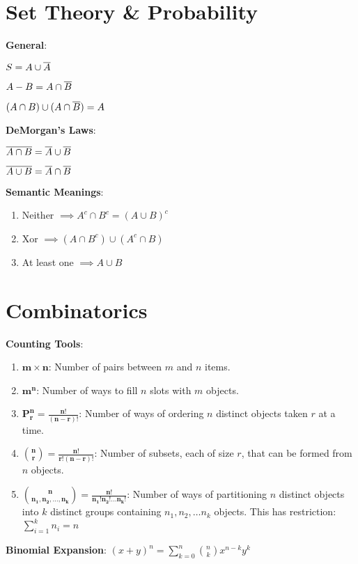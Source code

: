 \documentclass[12pt]{article}
\newcommand{\defn}[1]{\textbf{#1}:}
\newcommand{\mdef}[1]{$\mathbf{#1}$:}
\begin{document}
\section{Set Theory \& Probability}

\defn{General}
\begin{enumerate*}[label=(\roman*)]
    \item $S = A\cup \overline{A}$
    \item $A-B = A\cap \overline{B}$
    \item $(A\cap B)\cup (A\cap\overline{B}) = A$
\end{enumerate*}

\noindent\defn{DeMorgan's Laws}
\begin{enumerate*}[label=(\roman*)]
    \item $\overline{A \cap B} = \overline{A} \cup \overline{B}$
    \item $\overline{A \cup B} = \overline{A} \cap \overline{B}$
\end{enumerate*}

\noindent\defn{Semantic Meanings}
\begin{enumerate}[label=(\roman*)]
    \item Neither $\implies A^c \cap B^c = (A\cup B)^c$
    \item Xor $\implies (A \cap B^c) \cup (A^c\cap B)$
    \item At least one $\implies A\cup B$
\end{enumerate}

\section{Combinatorics}
\defn{Counting Tools}
\begin{enumerate}[label=(\alph*)]
    \item \mdef{m\times n} Number of pairs between $m$ and $n$ items.
    \item \mdef{m^n} Number of ways to fill $n$ slots with $m$ objects.
    \item \mdef{P_r^n=\frac{n!}{(n-r)!}} Number of ways of ordering $n$ distinct objects taken $r$ at a time.
    \item \mdef{\binom{n}{r}=\frac{n!}{r!(n-r)!}} Number of subsets, each of size $r$, that can be formed from $n$ objects.
    \item \mdef{\binom{n}{n_1,n_2,\ldots,n_k} = \frac{n!}{n_1!n_2!\ldots n_k!}}
    Number of ways of partitioning $n$ distinct objects into $k$ distinct groups
    containing $n_1, n_2,\ldots n_k$ objects. This has restriction: $\sum_{i=1}^{k}n_i = n$
\end{enumerate}
\noindent\defn{Binomial Expansion} $(x+y)^n = \sum_{k=0}^{n}\binom{n}{k}x^{n-k}y^k$
\end{document}

